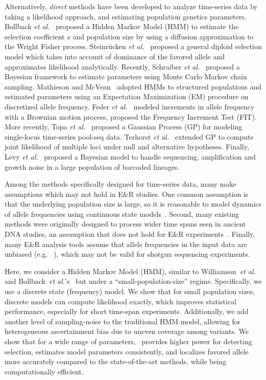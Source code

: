 \documentclass[9pt,twocolumn,twoside]{gsajnl}
\begin{document}
Alternatively, \emph{direct} methods have been developed to analyze
time-series data by taking a likelihood approach, and estimating
population genetics parameters.  Bollback \emph{et
	al.}~\cite{bollback2008estimation} proposed a Hidden Markov Model
(HMM) to estimate the selection coefficient $s$ and population size by
using a diffusion approximation to the Wright Fisher 
process.  Steinr\"{u}cken \emph{et al.}~\cite{steinrucken2014novel}
proposed a general diploid selection model which takes into account of
dominance of the favored allele and approximates likelihood
analytically. Recently, Schraiber \emph{et
	al.}~\cite{schraiber2016bayesian} proposed a Bayesian framework to
estimate parameters using Monte Carlo Markov chain sampling. Mathieson
and McVean~\cite{mathieson2013estimating} adopted HMMs to structured
populations and estimated parameters using an Expectation Maximization
(EM) procedure on discretized allele frequency.  Feder \emph{et
	al.}~\cite{feder2014Identifying} modeled increments in allele
frequency with a Brownian motion process, proposed the Frequency
Increment Test (FIT). More recently, Topa \emph{et
	al.}~\cite{topa2015gaussian} proposed a Gaussian Process (GP) for
modeling single-locus time-series pool-seq data. Terhorst \emph{et
	al.}~\cite{Terhorst2015Multi} extended GP to compute joint
likelihood of multiple loci under null and alternative
hypotheses. Finally, Levy \emph{et al.}~\cite{levy2015quantitative} proposed a
Bayesian model to handle sequencing, amplification and growth noise in
a large population of barcoded lineages.



Among the methods specifically designed for time-series data, many
make assumptions which may not hold in E\&R studies. One common
assumption is that the underlying population size is large, so it is
reasonable to model dynamics of allele frequencies using continuous
state models~\cite{bollback2008estimation, feder2014Identifying,
	Terhorst2015Multi}. Second, many existing methods were originally
designed to process wider time spans seen in ancient DNA studies, an
assumption that does not hold for E\&R
experiments~\cite{steinrucken2014novel,
	schraiber2016bayesian}. Finally, many E\&R analysis tools assume
that allele frequencies in the input data are unbiased
(e.g. ~\cite{bollback2008estimation}), which may not be valid for
shotgun sequencing experiments.

Here, we consider a Hidden Markov Model (HMM), similar to
Williamson~\emph{et al.}~\cite{williamson1999using} and
Bollback~\emph{et al.}'s~\cite{bollback2008estimation} but under a
``small-population-size'' regime. Specifically, we use a discrete
state (frequency) model.  We show that for small population sizes,
discrete models can compute likelihood exactly, which improves
statistical performance, especially for short time-span
experiments. Additionally, we add another level of sampling-noise to
the traditional HMM model, allowing for heterogeneous ascertainment
bias due to uneven coverage among variants. We show that for a wide
range of parameters, \comale\ provides higher power for detecting
selection, estimates model parameters consistently, and localizes
favored allele more accurately compared to the state-of-the-art
methods, while being computationally efficient.
\end{document}
